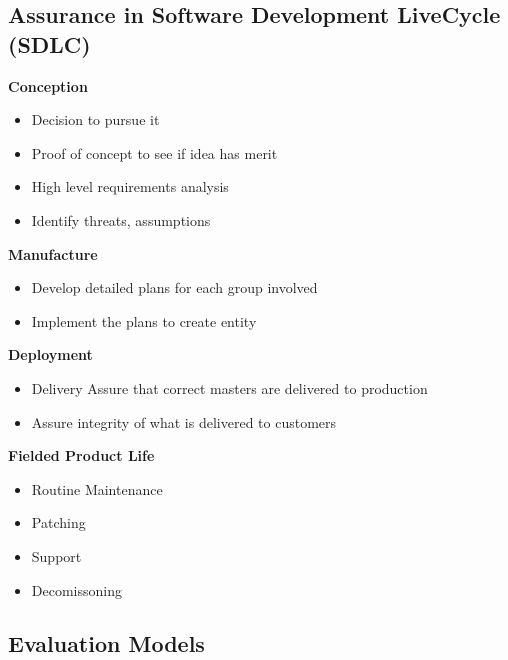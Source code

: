 \subsection{Assurance in Software Development LiveCycle (SDLC)}
\textbf{Conception}
\begin{itemize}
    \item Decision to pursue it
    \item Proof of concept to see if idea has merit
    \item High level requirements analysis
    \item Identify threats, assumptions
\end{itemize}
\textbf{Manufacture}
\begin{itemize}
    \item Develop detailed plans for each group involved
    \item Implement the plans to create entity
\end{itemize}
\textbf{Deployment}
\begin{itemize}
    \item Delivery Assure that correct masters are delivered to production
    \item Assure integrity of what is delivered to customers
\end{itemize}
\textbf{Fielded Product Life}
\begin{itemize}
    \item Routine Maintenance
    \item Patching
    \item Support
    \item Decomissoning
\end{itemize}

\subsection{Evaluation Models}
